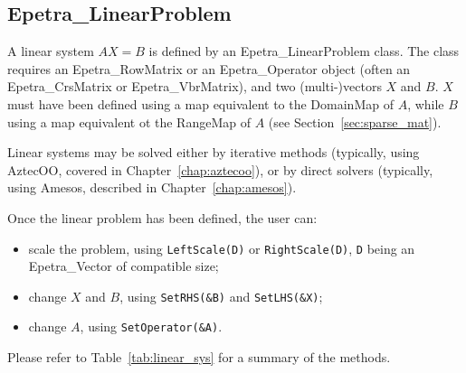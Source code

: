 
\subsection{Epetra\_LinearProblem}
\label{sec:linear_problem}

A linear system $A X = B$ is defined by an Epetra\_LinearProblem class.
The class requires an Epetra\_RowMatrix or an Epetra\_Operator object
(often an Epetra\_CrsMatrix or Epetra\_VbrMatrix), and two
(multi-)vectors $X$ and $B$. $X$ must have been defined using a map
equivalent to the DomainMap of $A$, while $B$ using a map equivalent ot
the RangeMap of $A$ (see Section~\ref{sec:sparse_mat}).

Linear systems may be solved either by iterative methods (typically,
using AztecOO, covered in Chapter~\ref{chap:aztecoo}), or by direct
solvers (typically, using Amesos, described in
Chapter~\ref{chap:amesos}).

Once the linear problem has been defined, the user can:

\begin{itemize}
\item scale the problem, using \verb!LeftScale(D)! or
  \verb!RightScale(D)!, \verb!D! being an Epetra\_Vector of compatible
  size;
\item change $X$ and $B$, using \verb!SetRHS(&B)! and \verb!SetLHS(&X)!;
\item change $A$, using \verb!SetOperator(&A)!.
\end{itemize}

Please refer to Table~\ref{tab:linear_sys} for a summary of the methods.

